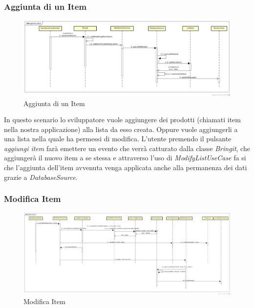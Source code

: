\subsubsection{Aggiunta di un Item}

\label{Aggiunta di un Item}
\begin{figure}[H]
	\centering
	\includegraphics[width=\textwidth]{Sezioni/Diagrammi/App/aggiuntaitem.png}
	\caption{Aggiunta di un Item}
\end{figure}

In questo scenario lo sviluppatore vuole aggiungere dei prodotti (chiamati item nella nostra applicazione) alla lista da esso creata. Oppure vuole aggiungerli a una lista nella quale ha permessi di modifica. L'utente premendo il pulsante \textit{aggiungi item} farà emettere un evento che verrà catturato dalla classe \textit{Bringit}, che aggiungerà il nuovo item a se stessa e attraverso l'uso di \textit{ModifyListUseCase} fa si che l'aggiunta dell'item avvenuta venga applicata anche alla permanenza dei dati grazie a \textit{DatabaseSource}.


\subsubsection{Modifica Item}

\label{Modifica Item}
\begin{figure}[H]
	\centering
	\includegraphics[width=\textwidth]{Sezioni/Diagrammi/App/modifica_item.jpg}
	\caption{Modifica Item}
\end{figure}

